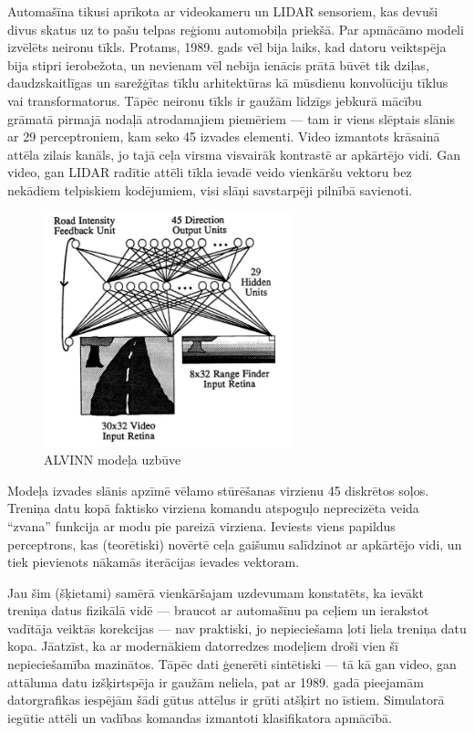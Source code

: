 \documentclass[12pt, a4paper]{article}
\numberwithin{equation}{section} %
\begin{document}
Automašīna tikusi aprīkota ar videokameru un LIDAR sensoriem, kas devuši divus skatus uz to pašu telpas reģionu automobiļa priekšā. Par apmācāmo modeli izvēlēts neironu tīkls. Protams, 1989. gads vēl bija laiks, kad datoru veiktspēja bija stipri ierobežota, un nevienam vēl nebija ienācis prātā būvēt tik dziļas, daudzskaitlīgas un sarežģītas tīklu arhitektūras kā mūsdienu konvolūciju tīklus vai transformatorus. Tāpēc neironu tīkls ir gaužām līdzīgs jebkurā mācību grāmatā pirmajā nodaļā atrodamajiem piemēriem --- tam ir viens slēptais slānis ar 29 perceptroniem, kam seko 45 izvades elementi. Video izmantots krāsainā attēla zilais kanāls, jo tajā ceļa virsma visvairāk kontrastē ar apkārtējo vidi. Gan video, gan LIDAR radītie attēli tīkla ievadē veido vienkāršu vektoru bez nekādiem telpiskiem kodējumiem, visi slāņi savstarpēji pilnībā savienoti.

\begin{figure}[t!]
    \centering
    \includegraphics[height=6.8cm,page=1]{../img/alvinn_architecture.png}
    \caption{ALVINN modeļa uzbūve \cite{pomerleau1989alvinn}}
\end{figure}

Modeļa izvades slānis apzīmē vēlamo stūrēšanas virzienu 45 diskrētos soļos. Treniņa datu kopā faktisko virziena komandu atspoguļo neprecizēta veida ``zvana'' funkcija ar modu pie pareizā virziena. Ieviests viens papildus perceptrons, kas (teorētiski) novērtē ceļa gaišumu salīdzinot ar apkārtējo vidi, un tiek pievienots nākamās iterācijas ievades vektoram.

Jau šim (šķietami) samērā vienkāršajam uzdevumam konstatēts, ka ievākt treniņa datus fizikālā vidē --- braucot ar automašīnu pa ceļiem un ierakstot vadītāja veiktās korekcijas --- nav praktiski, jo nepieciešama ļoti liela treniņa datu kopa. Jāatzīst, ka ar modernākiem datorredzes modeļiem droši vien šī nepieciešamība mazinātos. Tāpēc dati ģenerēti sintētiski --- tā kā gan video, gan attāluma datu izšķirtspēja ir gaužām neliela, pat ar 1989. gadā pieejamām datorgrafikas iespējām šādi gūtus attēlus ir grūti atšķirt no īstiem. Simulatorā iegūtie attēli un vadības komandas izmantoti klasifikatora apmācībā.
\end{document}
